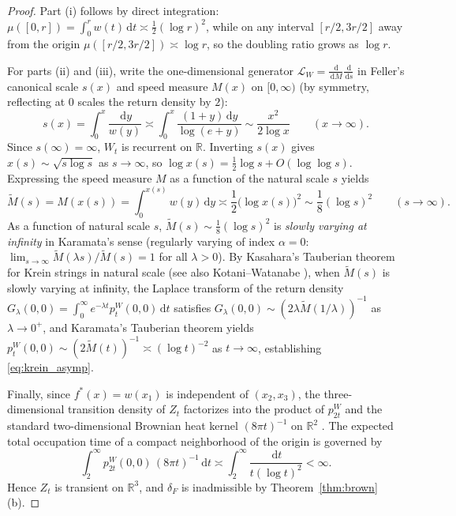 \documentclass[a4paper,11pt,noarxiv]{quantumarticle}
\newcommand{\R}{\mathbb{R}}
\newcommand{\dd}{\,\mathrm{d}}
\theoremstyle{plain}
\theoremstyle{definition}
\theoremstyle{remark}
\begin{document}
\begin{proof}
Part (i) follows by direct integration: $\mu([0,r])=\int_0^r w(t)\dd t
\asymp\tfrac12(\log r)^2$, while on any interval $[r/2,3r/2]$ away from
the origin $\mu([r/2,3r/2])\asymp\log r$, so the doubling ratio grows as
$\log r$.

For parts (ii) and (iii), write the one-dimensional generator
$\mathcal L_W=\frac{\dd}{\dd M}\frac{\dd}{\dd s}$ in Feller's canonical
scale $s(x)$ and speed measure $M(x)$ on $[0,\infty)$ (by symmetry,
reflecting at $0$ scales the return density by $2$):
\[
s(x)=\int_0^x\frac{\dd y}{w(y)}
\asymp\int_0^x\frac{(1+y)\dd y}{\log(e+y)}
\sim\frac{x^2}{2\log x}\qquad(x\to\infty).
\]
Since $s(\infty)=\infty$, $W_t$ is recurrent on $\R$. Inverting $s(x)$
gives $x(s)\sim\sqrt{s\log s}$ as $s\to\infty$, so
$\log x(s)=\tfrac12\log s+O(\log\log s)$. Expressing the speed measure
$M$ as a function of the natural scale $s$ yields
\[
\widetilde M(s)=M(x(s))=\int_0^{x(s)}w(y)\dd y
\asymp\frac{1}{2}\bigl(\log x(s)\bigr)^2
\sim\frac{1}{8}(\log s)^2\qquad(s\to\infty).
\]
As a function of natural scale $s$, $\widetilde M(s)\sim\tfrac18(\log s)^2$
is \emph{slowly varying at infinity} in Karamata's sense (regularly
varying of index $\alpha=0$: $\lim_{s\to\infty}\widetilde M(\lambda s)/
\widetilde M(s)=1$ for all $\lambda>0$). By Kasahara's Tauberian theorem
for Krein strings in natural scale \cite[Theorem~2]{kasahara1975} (see
also Kotani--Watanabe \cite{kotani1982}), when $\widetilde M(s)$ is
slowly varying at infinity, the Laplace transform of the return density
$G_\lambda(0,0)=\int_0^\infty e^{-\lambda t}p_t^W(0,0)\dd t$ satisfies
$G_\lambda(0,0)\sim(2\lambda\widetilde M(1/\lambda))^{-1}$ as
$\lambda\to0^+$, and Karamata's Tauberian theorem yields
$p_t^W(0,0)\sim(2\widetilde M(t))^{-1}\asymp(\log t)^{-2}$ as
$t\to\infty$, establishing \eqref{eq:krein_asymp}.

Finally, since $f^*(x)=w(x_1)$ is independent of $(x_2,x_3)$, the
three-dimensional transition density of $Z_t$ factorizes into the
product of $p_{2t}^W$ and the standard two-dimensional Brownian heat
kernel $(8\pi t)^{-1}$ on $\R^2$ \cite{johnstonelalley1984}. The
expected total occupation time of a compact neighborhood of the origin
is governed by
\[
\int_2^\infty p_{2t}^W(0,0)\,(8\pi t)^{-1}\dd t
\asymp\int_2^\infty\frac{\dd t}{t(\log t)^2}<\infty.
\]
Hence $Z_t$ is transient on $\R^3$, and $\delta_F$ is inadmissible by
Theorem~\ref{thm:brown}(b).
\end{proof}
\end{document}
